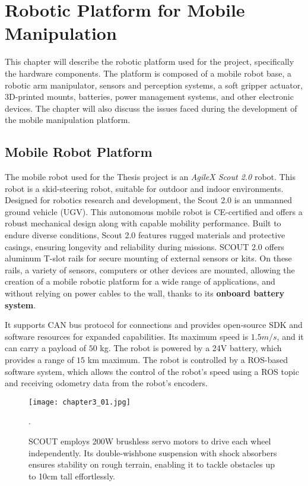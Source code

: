 
\chapter{Robotic Platform for Mobile Manipulation}

This chapter will describe the robotic platform used for the project, specifically the hardware components.
The platform is composed of a mobile robot base, a robotic arm manipulator, sensors and perception systems, 
a soft gripper actuator, 3D-printed mounts, batteries, power management systems, and other electronic devices.
The chapter will also discuss the issues faced during the development of the mobile manipulation platform.

\section{Mobile Robot Platform}

The mobile robot used for the Thesis project is an \textit{AgileX Scout 2.0} robot. 
This robot is a skid-steering robot, suitable for outdoor and indoor environments. 
Designed for robotics research and development, the Scout 2.0 is an unmanned ground vehicle (UGV). 
This autonomous mobile robot is CE-certified and offers a robust mechanical design along with capable mobility performance. 
Built to endure diverse conditions, Scout 2.0 features rugged materials and protective casings, ensuring longevity
and reliability during missions. SCOUT 2.0 offers aluminum T-slot rails for secure mounting of external sensors or kits. 
On these rails, a variety of sensors, computers or other devices are mounted, allowing the creation of a mobile robotic platform
for a wide range of applications, and without relying on power cables to the wall, thanks to its 
\textbf{onboard battery system}.

It supports CAN bus protocol for connections and provides open-source SDK and software resources for expanded capabilities.
Its maximum speed is $1.5 m/s$, and it can carry a payload of $50$ kg. 
The robot is powered by a 24V battery, which provides a range of $15$ km maximum. 
The robot is controlled by a ROS-based software system, which allows the control of the robot's speed using a ROS topic
and receiving odometry data from the robot's encoders.

\begin{figure}[t]
	\centering
	\texttt{[image: chapter3\_01.jpg]}
	\captionsetup{width=1\linewidth}
	\caption{SCOUT employs 200W brushless servo motors to drive each wheel independently. 
    Its double-wishbone suspension with shock absorbers ensures stability on rough terrain, 
    enabling it to tackle obstacles up to 10cm tall effortlessly.}.
	\label{fig:c3_img01}
\end{figure}

